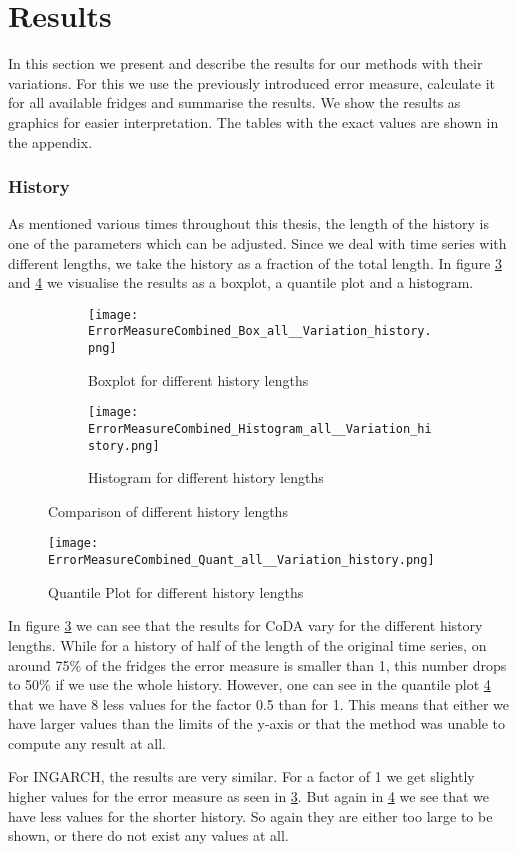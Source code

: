 \section{Results}
\label{sec:Results}

In this section we present and describe the results for our methods with their variations. For this we use the previously introduced error measure, calculate it for all available fridges and summarise the results. We show the results as graphics for easier interpretation. The tables with the exact values are shown in the appendix. 

\subsubsection{History}
\label{sec:History}

As mentioned various times throughout this thesis, the length of the history is one of the parameters which can be adjusted. Since we deal with time series with different lengths, we take the history as a fraction of the total length. In figure \ref{fig:History Comp1} and \ref{fig:History Comp2} we visualise the results as a boxplot, a quantile plot and a histogram. 

\begin{figure}[htb]
\centering
\begin{subfigure}[b]{0.8\textwidth}
\texttt{[image: ErrorMeasureCombined\_Box\_all\_\_Variation\_history.png]}
\caption{Boxplot for different history lengths}
\label{fig:History Box}
\end{subfigure}
\hfill
\begin{subfigure}[b]{0.8\textwidth}
\texttt{[image: ErrorMeasureCombined\_Histogram\_all\_\_Variation\_history.png]}
\caption{Histogram for different history lengths}
\label{fig:History Hist}
\end{subfigure}
\caption{Comparison of different history lengths}
\label{fig:History Comp1}
\end{figure}

\begin{figure}[htb]
\centering
\texttt{[image: ErrorMeasureCombined\_Quant\_all\_\_Variation\_history.png]} 
\caption{Quantile Plot for different history lengths}
\label{fig:History Comp2}
\end{figure}

In figure \ref{fig:History Comp1} we can see that the results for CoDA vary for the different history lengths. While for a history of half of the length of the original time series, on around 75\% of the fridges the error measure is smaller than 1, this number drops to 50\% if we use the whole history. However, one can see in the quantile plot \ref{fig:History Comp2} that we have 8 less values for the factor 0.5 than for 1. This means that either we have larger values than the limits of the y-axis or that the method was unable to compute any result at all. 

For INGARCH, the results are very similar. For a factor of 1 we get slightly higher values for the error measure as seen in \ref{fig:History Comp1}. But again in \ref{fig:History Comp2} we see that we have less values for the shorter history. So again they are either too large to be shown, or there do not exist any values at all. 